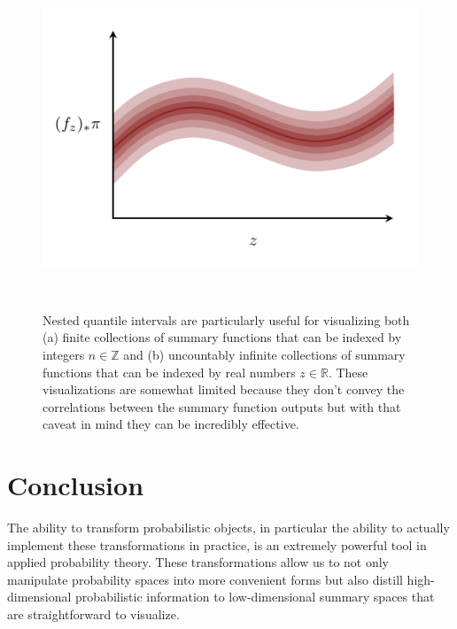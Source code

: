 \documentclass[
  letterpaper,
  DIV=11,
  numbers=noendperiod]{scrartcl}
\begin{document}
\begin{figure}
\begin{minipage}[t]{0.45\linewidth}
{{\includegraphics{figures/pushforward_characterizations/quantile_ribbons/continuous/continuous.pdf}

}

}

\subcaption{\label{fig-continuous-quantile-ribbons}}
\end{minipage}%
%
\begin{minipage}[t]{0.05\linewidth}

{\centering 

~

}

\end{minipage}%

\caption{\label{fig-quantile-ribbons}Nested quantile intervals are
particularly useful for visualizing both (a) finite collections of
summary functions that can be indexed by integers \(n \in \mathbb{Z}\)
and (b) uncountably infinite collections of summary functions that can
be indexed by real numbers \(z \in \mathbb{R}\). These visualizations
are somewhat limited because they don't convey the correlations between
the summary function outputs but with that caveat in mind they can be
incredibly effective.}

\end{figure}

\hypertarget{conclusion}{%
\section{Conclusion}\label{conclusion}}

The ability to transform probabilistic objects, in particular the
ability to actually implement these transformations in practice, is an
extremely powerful tool in applied probability theory. These
transformations allow us to not only manipulate probability spaces into
more convenient forms but also distill high-dimensional probabilistic
information to low-dimensional summary spaces that are straightforward
to visualize.
\end{document}
